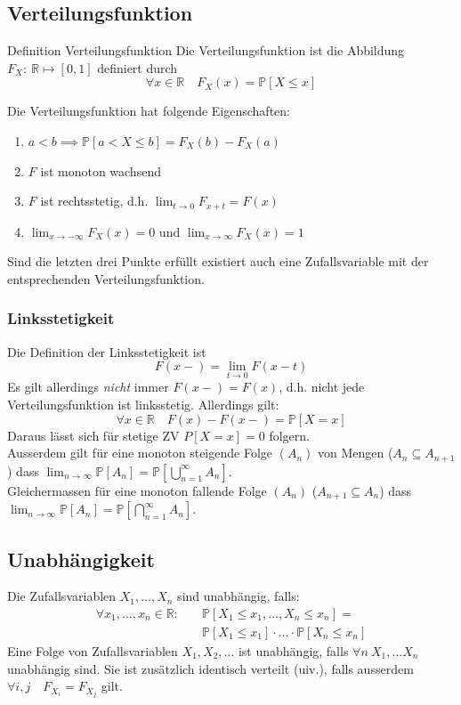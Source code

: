 \documentclass[a4paper,10pt]{article}
\def\R{\mathbb{R}}
\def\P{\mathbb{P}}
\begin{document}
\subsection{Verteilungsfunktion}
\begin{mainbox}{Definition Verteilungsfunktion}
	Die Verteilungsfunktion ist die Abbildung \(F_X: \ \R \mapsto [0,1]\) definiert durch
	\[\forall x \in \R \quad F_X(x) = \P[X \le x]\]
\end{mainbox}
Die Verteilungsfunktion hat folgende Eigenschaften:
\begin{enumerate}
	\item \(a < b \implies \P[a < X \le b] = F_X(b) - F_X(a)\)
	\item \(F\) ist monoton wachsend
	\item \(F\) ist rechtsstetig, d.h. \(\lim_{t \to 0} F_{x+t} = F(x)\)
	\item \(\lim_{x\to - \infty} F_X(x) = 0\) und \(\lim_{x\to \infty} F_X(x) = 1\)
\end{enumerate}

Sind die letzten drei Punkte erfüllt existiert auch eine Zufallsvariable mit der entsprechenden Verteilungsfunktion.

\subsubsection*{Linksstetigkeit}
Die Definition der Linksstetigkeit ist
\[F(x-) = \lim_{t\to 0} F(x-t)\]
Es gilt allerdings \textit{nicht} immer \(F(x-) = F(x)\), d.h. nicht jede Verteilungsfunktion ist linksstetig. Allerdings gilt:
\[\forall x \in \R \quad F(x) - F(x-) = \P[X=x]\]
Daraus lässt sich für stetige ZV \(P[X=x] = 0\) folgern.\\
Ausserdem gilt für eine monoton steigende Folge $(A_n)$ von Mengen ($A_n \subseteq A_{n+1}$) dass $\lim_{n \to \infty} \P[A_n] = \P[\bigcup_{n=1}^\infty A_n]$.\\
Gleichermassen für eine monoton fallende Folge $(A_n)$ ($A_{n+1} \subseteq A_n$) dass $\lim_{n \to \infty} \P[A_n] = \P[\bigcap_{n=1}^\infty A_n]$.

\subsection{Unabhängigkeit}
Die Zufallsvariablen \(X_1, \ldots, X_n\) sind unabhängig, falls:
\begin{align*}
	\forall x_1, \ldots, x_n \in \R: \quad & \P[X_1 \le x_1, \ldots, X_n \le x_n] =             \\
	                                       & \P[X_1 \le x_1] \cdot \ldots \cdot \P[X_n \le x_n]
\end{align*}
Eine Folge von Zufallsvariablen \(X_1, X_2, \ldots\) ist unabhängig, falls \(
\forall n \ X_1, \ldots X_n\) unabhängig sind. Sie ist zusätzlich identisch verteilt (uiv.), falls ausserdem \(\forall i,j \quad F_{X_i} = F_{X_j}\) gilt.
\end{document}
